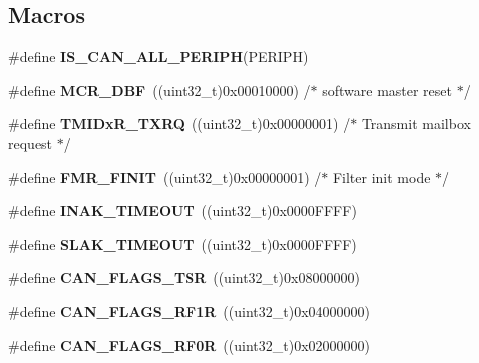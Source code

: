 \subsection*{Macros}
\begin{DoxyCompactItemize}
\item 
\#define {\bfseries I\-S\-\_\-\-C\-A\-N\-\_\-\-A\-L\-L\-\_\-\-P\-E\-R\-I\-P\-H}(P\-E\-R\-I\-P\-H)
\item 
\hypertarget{group___c_a_n_ga1ded3736beb63c49281f2983fc68c36d}{\#define {\bfseries M\-C\-R\-\_\-\-D\-B\-F}~((uint32\-\_\-t)0x00010000) /$\ast$ software master reset $\ast$/}\label{group___c_a_n_ga1ded3736beb63c49281f2983fc68c36d}

\item 
\hypertarget{group___c_a_n_gabeb6db5ba5c01da5084ec1605f868e18}{\#define {\bfseries T\-M\-I\-Dx\-R\-\_\-\-T\-X\-R\-Q}~((uint32\-\_\-t)0x00000001) /$\ast$ Transmit mailbox request $\ast$/}\label{group___c_a_n_gabeb6db5ba5c01da5084ec1605f868e18}

\item 
\hypertarget{group___c_a_n_ga6125d0273c466e402db1a8f5bf888857}{\#define {\bfseries F\-M\-R\-\_\-\-F\-I\-N\-I\-T}~((uint32\-\_\-t)0x00000001) /$\ast$ Filter init mode $\ast$/}\label{group___c_a_n_ga6125d0273c466e402db1a8f5bf888857}

\item 
\hypertarget{group___c_a_n_ga60a32132df242146efd3e9f7a079f0f0}{\#define {\bfseries I\-N\-A\-K\-\_\-\-T\-I\-M\-E\-O\-U\-T}~((uint32\-\_\-t)0x0000\-F\-F\-F\-F)}\label{group___c_a_n_ga60a32132df242146efd3e9f7a079f0f0}

\item 
\hypertarget{group___c_a_n_ga1bb8107706c8b4039ac55a122f3c65bb}{\#define {\bfseries S\-L\-A\-K\-\_\-\-T\-I\-M\-E\-O\-U\-T}~((uint32\-\_\-t)0x0000\-F\-F\-F\-F)}\label{group___c_a_n_ga1bb8107706c8b4039ac55a122f3c65bb}

\item 
\hypertarget{group___c_a_n_gac67e7d905ba11441bf9e14180805cf3a}{\#define {\bfseries C\-A\-N\-\_\-\-F\-L\-A\-G\-S\-\_\-\-T\-S\-R}~((uint32\-\_\-t)0x08000000)}\label{group___c_a_n_gac67e7d905ba11441bf9e14180805cf3a}

\item 
\hypertarget{group___c_a_n_ga2a03d73273ab353c8deb3a4730431977}{\#define {\bfseries C\-A\-N\-\_\-\-F\-L\-A\-G\-S\-\_\-\-R\-F1\-R}~((uint32\-\_\-t)0x04000000)}\label{group___c_a_n_ga2a03d73273ab353c8deb3a4730431977}

\item 
\hypertarget{group___c_a_n_ga4b22b2552759778ac07825240823a45f}{\#define {\bfseries C\-A\-N\-\_\-\-F\-L\-A\-G\-S\-\_\-\-R\-F0\-R}~((uint32\-\_\-t)0x02000000)}\label{group___c_a_n_ga4b22b2552759778ac07825240823a45f}


\end{DoxyCompactItemize}

